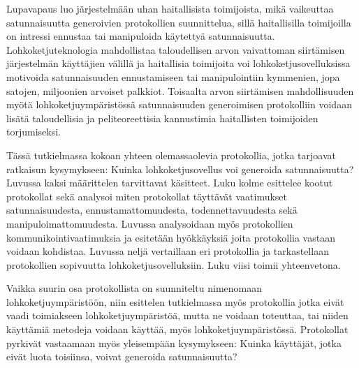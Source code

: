 Lupavapaus luo järjestelmään uhan haitallisista toimijoista, mikä vaikeuttaa satunnaisuutta generoivien protokollien suunnittelua, sillä haitallisilla toimijoilla on intressi ennustaa tai manipuloida käytettyä satunnaisuutta. Lohkoketjuteknologia mahdollistaa taloudellisen arvon vaivattoman siirtämisen järjestelmän käyttäjien välillä ja haitallisia toimijoita voi lohkoketjusovelluksissa motivoida satunnaisuuden ennustamiseen tai manipulointiin kymmenien, jopa satojen, miljoonien arvoiset palkkiot. Toisaalta arvon siirtämisen mahdollisuuden myötä lohkoketjuympäristössä satunnaisuuden generoimisen protokolliin voidaan lisätä taloudellisia ja peliteoreettisia kannustimia haitallisten toimijoiden torjumiseksi.

Tässä tutkielmassa kokoan yhteen olemassaolevia protokollia, jotka tarjoavat ratkaisun kysymykseen: Kuinka lohkoketjusovellus voi generoida satunnaisuutta? Luvussa kaksi määrittelen tarvittavat käsitteet. Luku kolme esittelee kootut protokollat sekä analysoi miten protokollat täyttävät vaatimukset satunnaisuudesta, ennustamattomuudesta, todennettavuudesta sekä manipuloimattomuudesta. Luvussa analysoidaan myös protokollien kommunikointivaatimuksia ja esitetään hyökkäyksiä joita protokollia vastaan voidaan kohdistaa. Luvussa neljä vertaillaan eri protokollia ja tarkastellaan protokollien sopivuutta lohkoketjusovelluksiin. Luku viisi toimii yhteenvetona.

Vaikka suurin osa protokollista on suunniteltu nimenomaan lohkoketjuympäristöön, niin esittelen tutkielmassa myös protokollia jotka eivät vaadi toimiakseen lohkoketjuympäristöä, mutta ne voidaan toteuttaa, tai niiden käyttämiä metodeja voidaan käyttää, myös lohkoketjuympäristössä. Protokollat pyrkivät vastaamaan myös yleisempään kysymykseen: Kuinka käyttäjät, jotka eivät luota toisiinsa, voivat generoida satunnaisuutta?